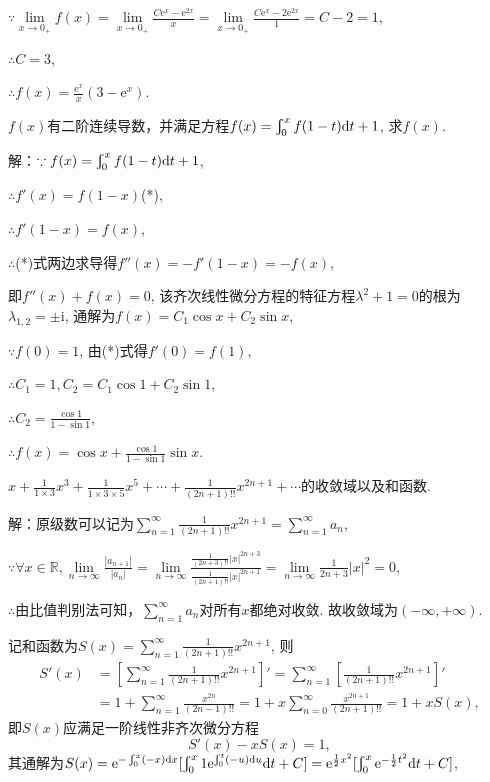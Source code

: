 \documentclass[12pt,UTF8]{ctexart}
\newcommand{\Int}[4]{\varint\nolimits_{#1}^{#2}#3\mathrm d#4}
\newcommand{\md}[1]{\mathrm d#1}
\newcommand{\me}[0]{\mathrm e}
\newcommand{\m}[0]{\mathrm }
\begin{document}
\begin{enumerate}
$\because\lim\limits_{x\rightarrow0_+}f(x)=\lim\limits_{x\rightarrow0_+}\frac{C\me^x-\me^{2x}}x=\lim\limits_{x\rightarrow0_+}\frac{C\me^x-2\me^{2x}}1=C-2=1$, 

$\therefore C=3$,

$\therefore f(x)=\frac{\me^x}x(3-\me^x)$.

$f(x)$有二阶连续导数，并满足方程$f(x)=\Int0x{f(1-t)}t+1$, 求$f(x)$.

解：$\because f(x)=\Int0x{f(1-t)}t+1$,

$\therefore f'(x)=f(1-x)$(*),

$\therefore f'(1-x)=f(x)$, 

$\therefore$(*)式两边求导得$f''(x)=-f'(1-x)=-f(x)$,

即$f''(x)+f(x)=0$, 该齐次线性微分方程的特征方程$\lambda^2+1=0$的根为$\lambda_{1,2}=\pm\m i$, 通解为$f(x)=C_1\cos x+C_2\sin x$,

$\because f(0)=1$, 由(*)式得$f'(0)=f(1)$,

$\therefore C_1=1,C_2=C_1\cos1+C_2\sin 1$,

$\therefore C_2=\frac{\cos1}{1-\sin1}$,

$\therefore f(x)=\cos x+\frac{\cos1}{1-\sin1}\sin x$.

$x+\frac1{1\times3}x^3+\frac1{1\times3\times5}x^5+\cdots+\frac1{(2n+1)!!}x^{2n+1}+\cdots$的收敛域以及和函数.

解：原级数可以记为$\sum_{n=1}^\infty\frac1{(2n+1)!!}x^{2n+1}=\sum_{n=1}^\infty a_n$,

$\because\forall x\in\mathbb R,\lim\limits_{n\rightarrow\infty}\frac{|a_{n+1}|}{|a_n|}=\lim\limits_{n\rightarrow\infty}\frac{\frac1{(2n+3)!!}|x|^{2n+3}}{\frac1{(2n+1)!!}|x|^{2n+1}}=\lim\limits_{n\rightarrow\infty}\frac1{2n+3}|x|^2=0$,

$\therefore$由比值判别法可知，$\sum_{n=1}^\infty a_n$对所有$x$都绝对收敛. 故收敛域为$(-\infty,+\infty)$.

记和函数为$S(x)=\sum_{n=1}^\infty\frac1{(2n+1)!!}x^{2n+1}$, 则
\[\begin{aligned}
S'(x)&=[\sum_{n=1}^\infty\frac1{(2n+1)!!}x^{2n+1}]'=\sum_{n=1}^\infty[\frac1{(2n+1)!!}x^{2n+1}]'\\
&=1+\sum_{n=1}^\infty\frac{x^{2n}}{(2n-1)!!}=1+x\sum_{n=0}^\infty\frac{x^{2n+1}}{(2n+1)!!}=1+xS(x),
\end{aligned}\]
即$S(x)$应满足一阶线性非齐次微分方程
\[S'(x)-xS(x)=1,\]
其通解为$S(x)=\me^{-\varint_0^x(-x)\md x}[\varint_0^x1\me^{\varint_0^t(-u)\md u}\md t+C]=\me^{\frac12x^2}[\varint_0^x\me^{-\frac12t^2}\md t+C]$,


\end{enumerate}
\end{document}
